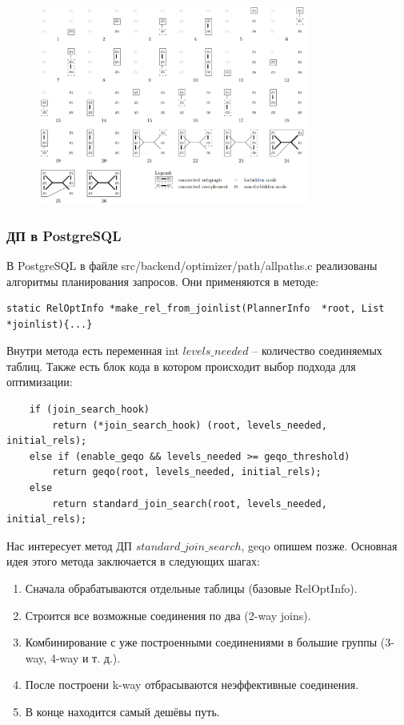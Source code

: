 \documentclass[12pt]{article}
\begin{document}
\begin{flushleft}
\begin{figure}[H]
    \centering
    \includegraphics[width=0.8\textwidth]{image.png} %
\end{figure}


\centering \subsubsection*{ДП в PostgreSQL}
\raggedright
В PostgreSQL в файле src/backend/optimizer/path/allpaths.c реализованы алгоритмы планирования запросов.
Они применяются в методе:
\begin{lstlisting}
static RelOptInfo *make_rel_from_joinlist(PlannerInfo  *root, List  *joinlist){...}
\end{lstlisting}

Внутри метода есть переменная int $levels\_needed$ -- количество соединяемых таблиц.
Также есть блок кода в котором происходит выбор подхода для оптимизации:
\begin{lstlisting}
    if (join_search_hook)
        return (*join_search_hook) (root, levels_needed, initial_rels);
    else if (enable_geqo && levels_needed >= geqo_threshold)
        return geqo(root, levels_needed, initial_rels);
    else
        return standard_join_search(root, levels_needed, initial_rels);
\end{lstlisting}

Нас интересует метод ДП $standard\_join\_search$, geqo опишем позже.
Основная идея этого метода заключается в следующих шагах:

\begin{enumerate}
    \item Сначала обрабатываются отдельные таблицы (базовые RelOptInfo).
    \item Строится все возможные соединения по два (2-way joins).
    \item Комбинирование с уже построенными соединениями в большие группы (3-way, 4-way и т. д.).
    \item После построени k-way отбрасываются неэффективные соединения.
    \item В конце находится самый дешёвы путь.
\end{enumerate}


\end{flushleft}
\end{document}
